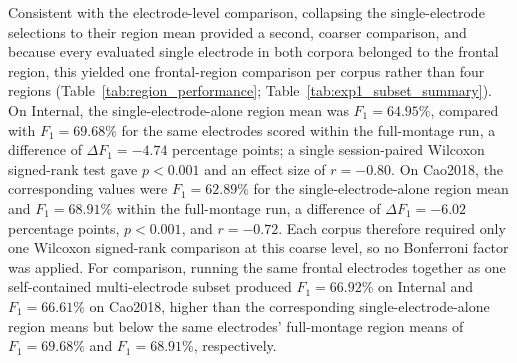 Consistent with the electrode-level comparison, collapsing the single-electrode selections to their region mean provided a second, coarser comparison, and because every evaluated single electrode in both corpora belonged to the frontal region, this yielded one frontal-region comparison per corpus rather than four regions (Table~\ref{tab:region_performance}; Table~\ref{tab:exp1_subset_summary}). On Internal, the single-electrode-alone region mean was $F_1=64.95\%$, compared with $F_1=69.68\%$ for the same electrodes scored within the full-montage run, a difference of $\Delta F_1=-4.74$ percentage points; a single session-paired Wilcoxon signed-rank test gave $p<0.001$ and an effect size of $r=-0.80$. On Cao2018, the corresponding values were $F_1=62.89\%$ for the single-electrode-alone region mean and $F_1=68.91\%$ within the full-montage run, a difference of $\Delta F_1=-6.02$ percentage points, $p<0.001$, and $r=-0.72$. Each corpus therefore required only one Wilcoxon signed-rank comparison at this coarse level, so no Bonferroni factor was applied. For comparison, running the same frontal electrodes together as one self-contained multi-electrode subset produced $F_1=66.92\%$ on Internal and $F_1=66.61\%$ on Cao2018, higher than the corresponding single-electrode-alone region means but below the same electrodes' full-montage region means of $F_1=69.68\%$ and $F_1=68.91\%$, respectively.
